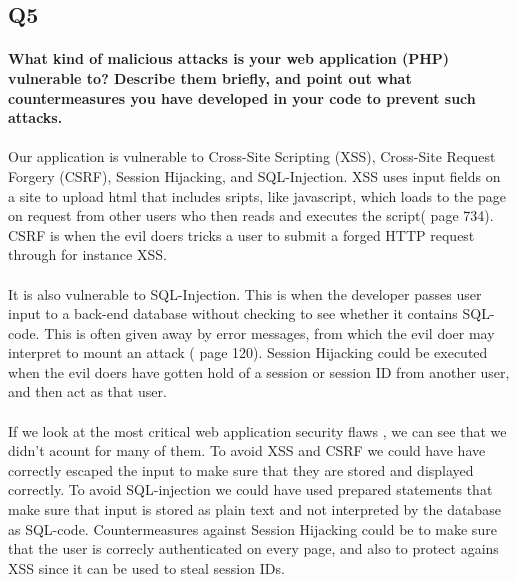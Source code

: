 \documentclass[a4paper,11pt]{article}
\begin{document}
\subsection{Q5}
\paragraph{What kind of malicious attacks is your web application (PHP) vulnerable to? Describe
them brieﬂy, and point out what countermeasures you have developed in your code to prevent
such attacks.}
\paragraph{}Our application is vulnerable to Cross-Site Scripting (XSS), Cross-Site Request Forgery (CSRF), Session Hijacking, and SQL-Injection. XSS uses input fields on a site to upload html that includes sripts, like javascript, which loads to the page on request from other users who then reads and executes the script(\cite{8} page 734). CSRF is when the evil doers tricks a user to submit a forged HTTP request through for instance XSS.
\paragraph{}It is also vulnerable to SQL-Injection. This is when the developer passes user input to a back-end database without checking to see whether it contains SQL-code. This is often given away by error messages, from which the evil doer may interpret to mount an attack (\cite{8} page 120). Session Hijacking could be executed when the evil doers have gotten hold of a session or session ID from another user, and then act as that user.
\paragraph{}If we look at the most critical web application security flaws \cite{7}, we can see that we didn't acount for many of them. To avoid XSS and CSRF we could have have correctly escaped the input to make sure that they are stored and displayed correctly. To avoid SQL-injection we could have used prepared statements that make sure that input is stored as plain text and not interpreted by the database as SQL-code. Countermeasures against Session Hijacking could be to make sure that the user is correcly authenticated on every page, and also to protect agains XSS since it can be used to steal session IDs.
\end{document}
